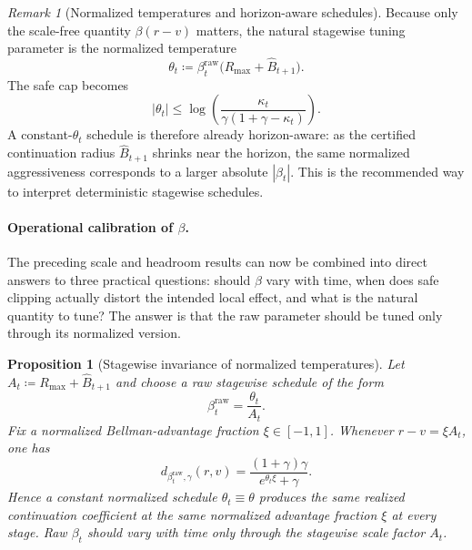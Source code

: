 \documentclass{article}
\newtheorem{proposition}[proposition]{Proposition}
\theoremstyle{remark}
\newtheorem{remark}[remark]{Remark}
\newcommand{\defeq}{\coloneqq}
\newcommand{\Bhat}{\widehat B}
\begin{document}
\begin{remark}[Normalized temperatures and horizon-aware schedules]
\label{rem:normalized-temperature}
Because only the scale-free quantity $\beta(r-v)$ matters, the natural stagewise tuning parameter is the normalized temperature
\[
\theta_t\defeq \beta_t^{\mathrm{raw}}\bigl(R_{\max}+\Bhat_{t+1}\bigr).
\]
The safe cap becomes
\[
|\theta_t|
\le
\log\!\left(\frac{\kappa_t}{\gamma(1+\gamma-\kappa_t)}\right).
\]
A constant-$\theta_t$ schedule is therefore already horizon-aware: as the certified continuation radius $\Bhat_{t+1}$ shrinks near the horizon, the same normalized aggressiveness corresponds to a larger absolute $|\beta_t|$. This is the recommended way to interpret deterministic stagewise schedules.
\end{remark}

\paragraph{Operational calibration of $\beta$.}
The preceding scale and headroom results can now be combined into direct answers to three practical questions: should $\beta$ vary with time, when does safe clipping actually distort the intended local effect, and what is the natural quantity to tune? The answer is that the raw parameter should be tuned only through its normalized version.

\begin{proposition}[Stagewise invariance of normalized temperatures]
\label{prop:normalized-invariance}
Let $A_t\defeq R_{\max}+\Bhat_{t+1}$ and choose a raw stagewise schedule of the form
\[
\beta_t^{\mathrm{raw}}=\frac{\theta_t}{A_t}.
\]
Fix a normalized Bellman-advantage fraction $\xi\in[-1,1]$. Whenever $r-v=\xi A_t$, one has
\begin{equation}
d_{\beta_t^{\mathrm{raw}},\gamma}(r,v)
=
\frac{(1+\gamma)\gamma}{e^{\theta_t\xi}+\gamma}.
\label{eq:normalized-invariance}
\end{equation}
Hence a constant normalized schedule $\theta_t\equiv\theta$ produces the same realized continuation coefficient at the same normalized advantage fraction $\xi$ at every stage. Raw $\beta_t$ should vary with time only through the stagewise scale factor $A_t$.
\end{proposition}
\end{document}
